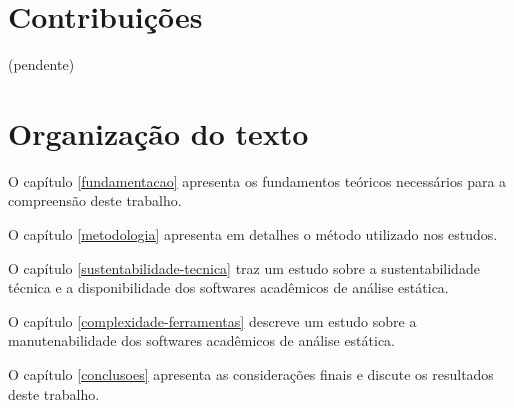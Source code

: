 \section{Contribuições}

(pendente)

\section{Organização do texto}

O capítulo \ref{fundamentacao} apresenta os fundamentos teóricos necessários
para a compreensão deste trabalho.

O capítulo \ref{metodologia} apresenta em detalhes o método utilizado nos
estudos.

O capítulo \ref{sustentabilidade-tecnica} traz um estudo sobre a
sustentabilidade técnica e a disponibilidade dos softwares acadêmicos de
análise estática.

O capítulo \ref{complexidade-ferramentas} descreve um estudo sobre a
manutenabilidade dos softwares acadêmicos de análise estática.

O capítulo \ref{conclusoes} apresenta as considerações finais e discute os
resultados deste trabalho.
